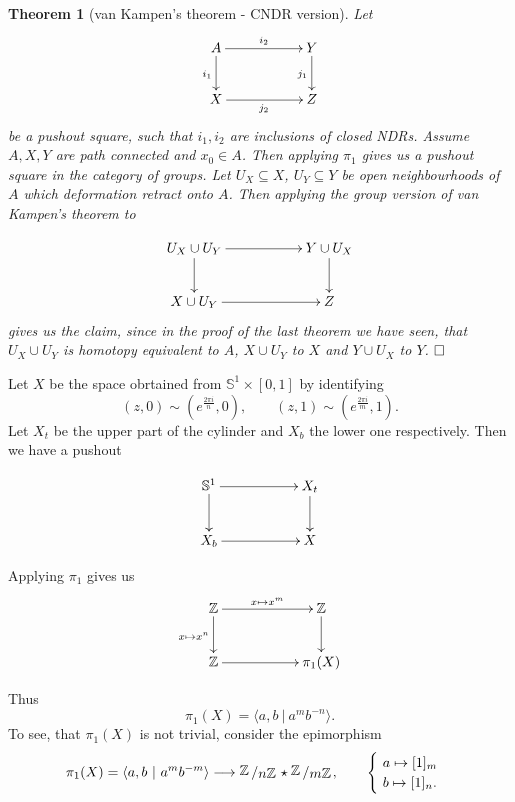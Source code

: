 \documentclass[11pt]{book}
\numberwithin{dummy}{section}
\newtheorem{theorem}{Theorem}[section]
\theoremstyle{nonumberbreak}
\newenvironment{pr}[1][]{\ifthenelse{\equal{#1}{}}{\proof}{\proof[#1]}\rm}{\endproof}
\newenvironment{ex}[1][]{\ifthenelse{\equal{#1}{}}{\example}{\example[#1]}\rm}{\endexample}
\newcommand{\la}{\longrightarrow}
\newcommand{\slant}[2]{{\raisebox{.1em}{$#1$}\left/\raisebox{-.1em}{$#2$}\right.}}
\begin{document}
\begin{spacing}{1.4}
\begin{theorem}[van Kampen's theorem - CNDR version]
Let 
$$
\begin{xy}
\xymatrix{
A \ar[rr]^{i_2} \ar[d]_{i_1} && Y \ar[d]_{j_1} \\ X \ar[rr]_{j_2} && Z
}
\end{xy}
$$
be a pushout square, such that $i_1, i_2$ are inclusions of closed NDRs. Assume $A,X,Y$ are path connected and $x_0 \in A$. Then applying $\pi_1$ gives us a pushout square in the category of groups.
\begin{pr}
Let $U_X \subseteq X$, $U_Y \subseteq Y$ be open neighbourhoods of $A$ which deformation retract onto $A$. Then applying the group version of van Kampen's theorem to 

$$
\begin{xy}
\xymatrix{
U_X \cup U_Y \ar[rr] \ar[d] && Y \cup U_X \ar[d] \\ X \cup U_Y \ar[rr] && Z
}
\end{xy}
$$
gives us the claim, since in the proof of the last theorem we have seen, that $U_X \cup U_Y$ is homotopy equivalent to $A$, $X \cup U_Y$ to $X$ and $Y \cup U_X$ to $Y$. $\hfill \Box$

\end{pr}

\end{theorem}


\begin{ex}
Let $X$ be the space obrtained from $\mathbb{S}^1 \times [0,1]$ by identifying
$$(z,0) \sim \left(e^{\frac{2\pi i}{n}}, 0\right), \qquad (z,1) \sim \left(e^{\frac{2\pi i}{m}}, 1\right).$$ Let $X_t$ be the upper part of the cylinder and $X_b$ the lower one respectively. Then we have a pushout

$$
\begin{xy}
\xymatrix{
\mathbb{S}^1 \ar[rr] \ar[d] && X_t \ar[d] \\ X_b \ar[rr] && X
}
\end{xy}
$$

Applying $\pi_1$ gives us
$$
\begin{xy}
\xymatrix{
\mathbb{Z} \ar[rr]^{x \mapsto x^m} \ar[d]_{x \mapsto x^n} && \mathbb{Z} \ar[d] \\ \mathbb{Z} \ar[rr] &&\pi_1(X)
}
\end{xy}
$$

Thus
$$\pi_1(X) = \langle a,b \ \vert \ a^mb^{-n} \rangle.$$
To see, that $\pi_1(X)$ is not trivial, consider the epimorphism
$$\pi_1(X) = \langle a,b \ \vert \ a^m b^{-m} \rangle \la \slant{\mathbb{Z}}{n \mathbb{Z}} \star \slant{\mathbb{Z}}{m \mathbb{Z}}, \qquad \begin{cases} \ a \mapsto [1]_{m} \\ \ b \mapsto [1]_n. \end{cases} $$


\end{ex}
\end{spacing}
\end{document}
